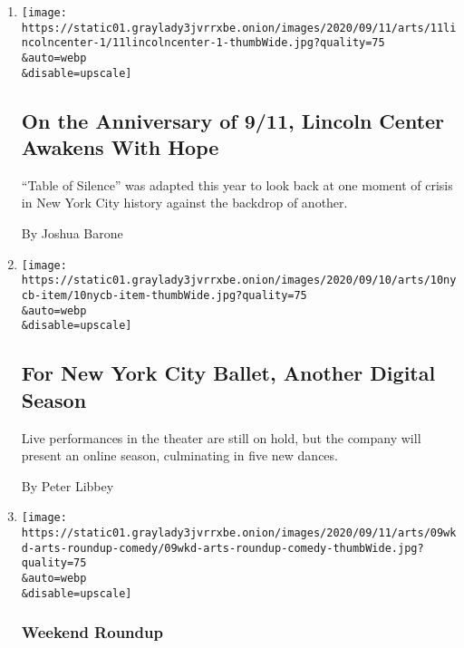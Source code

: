 \begin{enumerate}
\def\labelenumi{\arabic{enumi}.}
\item
  \href{/2020/09/11/arts/table-of-silence-9-11.html}{}

  \texttt{[image: https://static01.graylady3jvrrxbe.onion/images/2020/09/11/arts/11lincolncenter-1/11lincolncenter-1-thumbWide.jpg?quality=75\\\&auto=webp\\\&disable=upscale]}

  \hypertarget{on-the-anniversary-of-911-lincoln-center-awakens-with-hope}{%
  \subsection{On the Anniversary of 9/11, Lincoln Center Awakens With
  Hope}\label{on-the-anniversary-of-911-lincoln-center-awakens-with-hope}}

  ``Table of Silence'' was adapted this year to look back at one moment
  of crisis in New York City history against the backdrop of another.

  By Joshua Barone
\item
  \href{/2020/09/10/arts/dance/for-new-york-city-ballet-another-digital-season.html}{}

  \texttt{[image: https://static01.graylady3jvrrxbe.onion/images/2020/09/10/arts/10nycb-item/10nycb-item-thumbWide.jpg?quality=75\\\&auto=webp\\\&disable=upscale]}

  \hypertarget{for-new-york-city-ballet-another-digital-season}{%
  \subsection{For New York City Ballet, Another Digital
  Season}\label{for-new-york-city-ballet-another-digital-season}}

  Live performances in the theater are still on hold, but the company
  will present an online season, culminating in five new dances.

  By Peter Libbey
\item
  \href{/2020/09/10/arts/things-to-do-weekend-coronavirus.html}{}

  \texttt{[image: https://static01.graylady3jvrrxbe.onion/images/2020/09/11/arts/09wkd-arts-roundup-comedy/09wkd-arts-roundup-comedy-thumbWide.jpg?quality=75\\\&auto=webp\\\&disable=upscale]}

  \hypertarget{weekend-roundup}{%
  \subsubsection{Weekend Roundup}\label{weekend-roundup}}


\end{enumerate}

